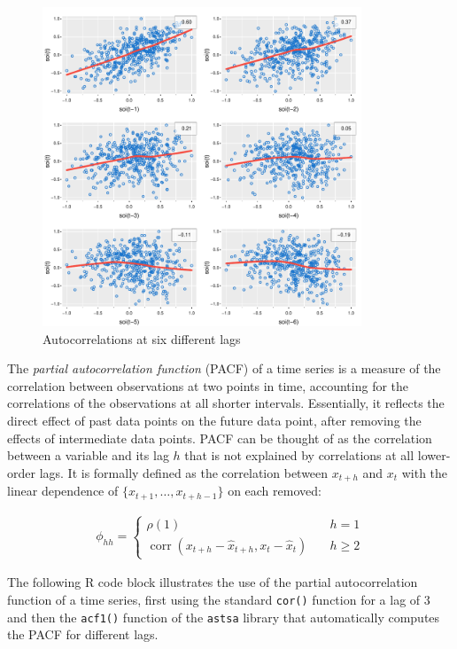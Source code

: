 \begin{figure}
\centering
\includegraphics[height=3.75in]{figure8a.pdf}
\caption{Autocorrelations at six different lags}
\label{fig:figure8a}
\end{figure}

The \emph{partial autocorrelation function} (PACF) of a time series is a measure of the correlation between observations at two points in time, accounting for the correlations of the observations at all shorter intervals. Essentially, it reflects the direct effect of past data points on the future data point, after removing the effects of intermediate data points. PACF can be thought of as the correlation between a variable and its lag $h$ that is not explained by correlations at all lower-order lags. It is formally defined as the correlation between $x_{t+h}$ and $x_t$ with the linear dependence of $\{x_{t+1}, \ldots, x_{t+h-1}\}$ on each removed:

\begin{align*}
\phi_{hh} = \begin{cases}\rho(1) &\quad h = 1 \\
 \operatorname{corr}(x_{t+h} - \hat{x}_{t+h}, x_t - \hat{x}_t) &\quad h \geq 2
 \end{cases}
\end{align*}

The following R code block illustrates the use of the partial autocorrelation function of a time series, first using the standard \texttt{cor()} function for a lag of $3$ and then the \texttt{acf1()} function of the \texttt{astsa} library that automatically computes the PACF for different lags.

